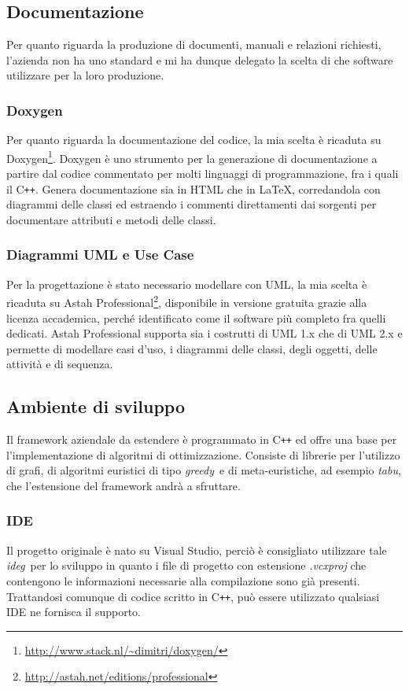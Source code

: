     \subsection{Documentazione}
        Per quanto riguarda la produzione di documenti, manuali e relazioni richiesti, l'azienda non ha uno standard e mi ha dunque delegato la scelta di che software utilizzare per la loro produzione. 
        \subsubsection{Doxygen}
        Per quanto riguarda la documentazione del codice, la mia scelta è ricaduta su Doxygen\footnote{{\color{blue} \url{http://www.stack.nl/~dimitri/doxygen/}}}. Doxygen è uno strumento per la generazione di documentazione a partire dal codice commentato per molti linguaggi di programmazione, fra i quali il C\texttt{++}. Genera documentazione sia in HTML che in \LaTeX, corredandola con diagrammi delle classi ed estraendo i commenti direttamenti dai sorgenti per documentare attributi e metodi delle classi.
        \subsubsection{Diagrammi UML e Use Case}
        Per la progettazione è stato necessario modellare con UML, la mia scelta è ricaduta su Astah Professional\footnote{{\color{blue} \url{http://astah.net/editions/professional}}}, disponibile in versione gratuita grazie alla licenza accademica, perché identificato come il software più completo fra quelli dedicati. Astah Professional supporta sia i costrutti di UML 1.x che di UML 2.x e permette di modellare casi d'uso, i diagrammi delle classi, degli oggetti, delle attività e di sequenza.

    \subsection{Ambiente di sviluppo}

Il framework aziendale da estendere è programmato in C\texttt{++} ed offre una base per l'implementazione di algoritmi di ottimizzazione. Consiste di librerie per l'utilizzo di grafi, di algoritmi euristici di tipo \emph{\gls{greedy}}\glsfirstoccur\ e di meta-euristiche, ad esempio \emph{\gls{tabu}}\glsfirstoccur, che l'estensione del framework andrà a sfruttare.

\subsubsection{IDE}
Il progetto originale è nato su Visual Studio, perciò è consigliato utilizzare tale \emph{\gls{ideg}}\glsfirstoccur\  per lo sviluppo in quanto i file di progetto con estensione \textit{.vcxproj} che contengono le informazioni necessarie alla compilazione sono già presenti.\\ Trattandosi comunque di codice scritto in C\texttt{++}, può essere utilizzato qualsiasi IDE ne fornisca il supporto.

